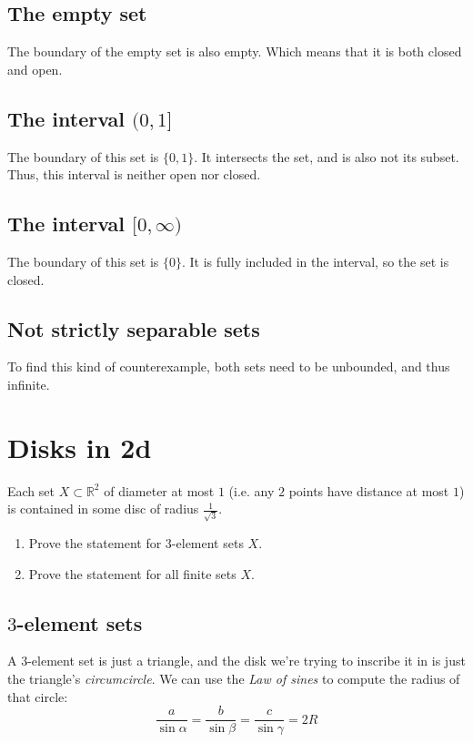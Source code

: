 \documentclass{article}
\newcommand{\R}{\mathbb{R}}
\begin{document}
  \subsection{The empty set}
  The boundary of the empty set is also empty. Which means that it is both closed and open.

  \subsection{The interval $(0, 1]$}
  The boundary of this set is $\{0, 1\}$. It intersects the set, and is also not its subset.
  Thus, this interval is neither open nor closed.

  \subsection{The interval $[0, \infty)$}
  The boundary of this set is $\{0\}$.
  It is fully included in the interval, so the set is closed.

  \subsection{Not strictly separable sets}
  To find this kind of counterexample, both sets need to be unbounded, and thus infinite.

  \section{Disks in 2d}
  \begin{centerframebox}
    Each set $X \subset \R^2$ of diameter at most $1$ (i.e. any $2$ points have distance at most $1$) is
    contained in some disc of radius $\frac{1}{\sqrt{3}}$.

    \begin{enumerate}[label=(\roman*)]
      \item Prove the statement for $3$-element sets $X$.
      \item Prove the statement for all finite sets $X$.
    \end{enumerate}
  \end{centerframebox}

  \subsection{$3$-element sets}
  A $3$-element set is just a triangle, and the disk we're trying to inscribe it in is just the triangle's \textit{circumcircle}.
  We can use the \textit{Law of sines} to compute the radius of that circle:
  \[ \frac{a}{\sin{\alpha}} = \frac{b}{\sin{\beta}} = \frac{c}{\sin{\gamma}} = 2R \]
\end{document}
